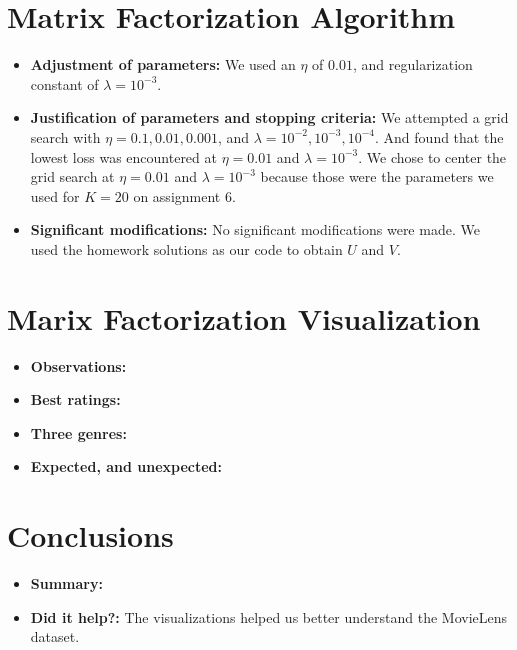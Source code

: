 \section{Matrix Factorization Algorithm}
\medskip
\begin{itemize}
  \item \textbf{Adjustment of parameters:}
    We used an $\eta$ of $0.01$, and regularization constant of
    $\lambda = 10^{-3}$.
  \item \textbf{Justification of parameters and stopping criteria:}
    We attempted a grid search with $\eta=0.1, 0.01, 0.001$, and
    $\lambda = 10^{-2}, 10^{-3}, 10^{-4}$. And found that the lowest loss was
    encountered at $\eta=0.01$ and $\lambda = 10^{-3}$. We chose to center the
    grid search at $\eta=0.01$ and $\lambda = 10^{-3}$ because those were the
    parameters we used for $K=20$ on assignment 6.
  \item \textbf{Significant modifications:}
    No significant modifications were made. We used the homework solutions as
    our code to obtain $U$ and $V$.
\end{itemize}


\section{Marix Factorization Visualization}
\medskip
\begin{itemize}
  \item \textbf{Observations:} 
  \item \textbf{Best ratings:}
  \item \textbf{Three genres:}
  \item \textbf{Expected, and unexpected:}
\end{itemize}



\section{Conclusions}
\medskip
\begin{itemize}
  \item \textbf{Summary:}
  \item \textbf{Did it help?:} The visualizations helped us better understand the MovieLens dataset. 
\end{itemize}


